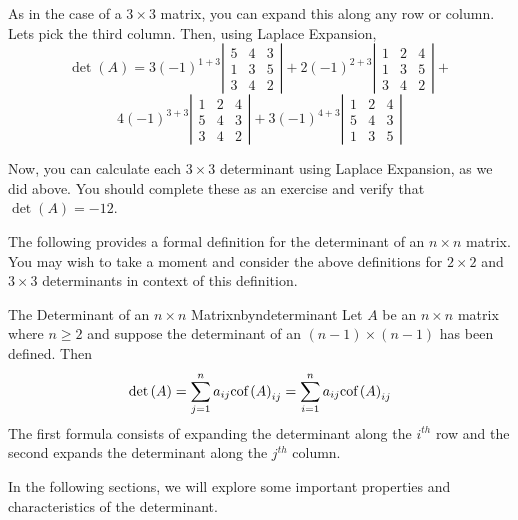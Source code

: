 \begin{solution} As in the case of a $3\times 3$ matrix, you can expand this along any row or
column. Lets pick the third column. Then, using Laplace Expansion, 
\begin{equation*}
\det \left( A\right) 
=
3\left( -1\right) ^{1+3}\left\vert
\begin{array}{rrr}
5 & 4 & 3 \\
1 & 3 & 5 \\
3 & 4 & 2
\end{array}
\right\vert +2\left( -1\right) ^{2+3}\left\vert
\begin{array}{rrr}
1 & 2 & 4 \\
1 & 3 & 5 \\
3 & 4 & 2
\end{array}
\right\vert +
\end{equation*}
\begin{equation*}
4\left( -1\right) ^{3+3}\left\vert
\begin{array}{rrr}
1 & 2 & 4 \\
5 & 4 & 3 \\
3 & 4 & 2
\end{array}
\right\vert +3\left( -1\right) ^{4+3}\left\vert
\begin{array}{rrr}
1 & 2 & 4 \\
5 & 4 & 3 \\
1 & 3 & 5
\end{array}
\right\vert 
\end{equation*}

Now, you can calculate each $3 \times 3$ determinant using Laplace Expansion, as we did above. 
You should complete these as an exercise and verify that $\det \left( A \right)= -12$. 
\end{solution}

The following provides a formal definition for the determinant of an $n \times n$ matrix. You may
wish to take a moment and consider the above definitions for $2 \times 2$ and $3 \times 3$ determinants 
in context of this definition.

\begin{definition}{The Determinant of an $n\times n$ Matrix}{nbyndeterminant}
Let $A$ be an $n\times n$ matrix where $n\geq 2$ and suppose the
determinant of an $\left( n-1\right) \times \left( n-1\right) $ has been
defined. Then
\begin{equation*}
\det \left( A\right) =\sum_{j=1}^{n}a_{ij}\mbox{cof}\left( A\right)
_{ij}=\sum_{i=1}^{n}a_{ij}\mbox{cof}\left( A\right) _{ij}
\end{equation*}
The first formula consists of expanding the determinant along the $i^{th}$
row and the second expands the determinant along the $j^{th}$ column.
\end{definition}

In the following sections, we will explore some important properties and characteristics of the determinant.
